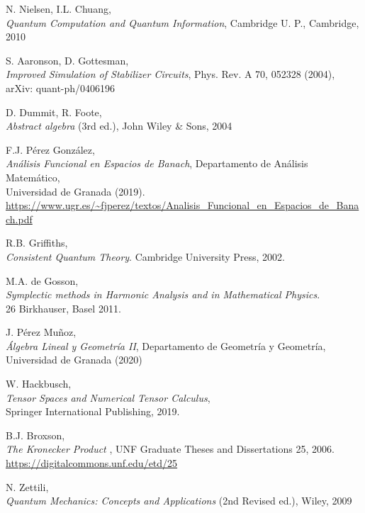 \documentclass[11pt,a4paper,twoside,pdf]{article}
\numberwithin{equation}{section}
\begin{document}
\begin{thebibliography}{100}
	
		N. Nielsen, I.L. Chuang, \\
		{\em Quantum Computation and Quantum Information}, Cambridge U. P., Cambridge, 2010

		S. Aaronson, D. Gottesman, \\
		{\em Improved Simulation of Stabilizer Circuits}, Phys. Rev. A 70, 052328 (2004), \\
		arXiv: quant-ph/0406196
		
		D. Dummit, R. Foote, \\    	
		{\em Abstract algebra} (3rd ed.), John Wiley \& Sons, 2004

		F.J. Pérez González, \\    	
		{\em Análisis Funcional en Espacios de Banach}, Departamento de Análisis Matemático, \\
		Universidad de Granada (2019).\\
		\url{https://www.ugr.es/~fjperez/textos/Analisis_Funcional_en_Espacios_de_Banach.pdf}
	
		R.B. Griffiths,  \\
		{\em Consistent Quantum Theory}. Cambridge University Press, 2002.
		
		M.A. de Gosson, \\
		{\em Symplectic methods in Harmonic Analysis and in Mathematical Physics}. \\
		26 Birkhauser, Basel 2011.

		J. Pérez Muñoz, \\    	
		{\em Álgebra Lineal y Geometría II}, Departamento de Geometría y Geometría, \\
		Universidad de Granada (2020)
		
		W. Hackbusch, \\    	
		{\em Tensor Spaces and Numerical Tensor Calculus},  \\
		Springer International Publishing, 2019. 

		B.J. Broxson, \\    	
		{\em The Kronecker Product} , UNF Graduate Theses and Dissertations 25, 2006. \\
		\url{https://digitalcommons.unf.edu/etd/25}	

		N. Zettili, \\
		{\em Quantum Mechanics: Concepts and Applications} (2nd Revised ed.), Wiley, 2009


\end{thebibliography}
\end{document}
